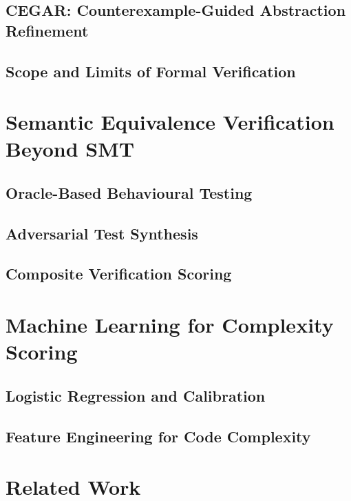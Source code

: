 \documentclass[12pt,a4paper]{report}
\begin{document}
  \subsection{CEGAR: Counterexample-Guided Abstraction Refinement}
  \label{subsec:cegar-theory}

  \subsection{Scope and Limits of Formal Verification}
  \label{subsec:fv-scope}

\section{Semantic Equivalence Verification Beyond SMT}
\label{sec:semantic-equiv-theory}

  \subsection{Oracle-Based Behavioural Testing}
  \label{subsec:oracle-testing-theory}

  \subsection{Adversarial Test Synthesis}
  \label{subsec:adversarial-synthesis-theory}

  \subsection{Composite Verification Scoring}
  \label{subsec:composite-scoring-theory}

\section{Machine Learning for Complexity Scoring}
\label{sec:ml-theory}

  \subsection{Logistic Regression and Calibration}
  \label{subsec:lr-calibration}

  \subsection{Feature Engineering for Code Complexity}
  \label{subsec:code-features}

\section{Related Work}
\label{sec:related-work}
\end{document}
